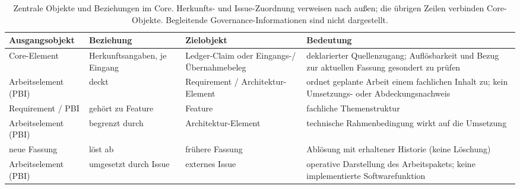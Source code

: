 
\begin{table}[htbp]
  \centering
  \small
  \begin{tabular}{>{\raggedright\arraybackslash}p{}>{\raggedright\arraybackslash}p{}>{\raggedright\arraybackslash}p{}>{\raggedright\arraybackslash}p{}}
    \hline
    \textbf{Ausgangsobjekt} & \textbf{Beziehung} & \textbf{Zielobjekt} & \textbf{Bedeutung} \\
    \hline
    Core-Element & Herkunftsangaben, je Eingang & Ledger-Claim oder Eingangs-/Übernahmebeleg & deklarierter Quellenzugang; Auflösbarkeit und Bezug zur aktuellen Fassung gesondert zu prüfen \\
    Arbeitselement (PBI) & deckt & Requirement / Architektur-Element & ordnet geplante Arbeit einem fachlichen Inhalt zu; kein Umsetzungs- oder Abdeckungsnachweis \\
    Requirement / PBI & gehört zu Feature & Feature & fachliche Themenstruktur \\
    Arbeitselement (PBI) & begrenzt durch & Architektur-Element & technische Rahmenbedingung wirkt auf die Umsetzung \\
    neue Fassung & löst ab & frühere Fassung & Ablösung mit erhaltener Historie (keine Löschung) \\
    Arbeitselement (PBI) & umgesetzt durch Issue & externes Issue & operative Darstellung des Arbeitspakets; keine implementierte Softwarefunktion \\
    \hline
  \end{tabular}
  \caption[Objekte und Beziehungen im Core]{Zentrale Objekte und
    Beziehungen im Core. Herkunfts- und Issue-Zuordnung verweisen
    nach außen; die übrigen Zeilen verbinden Core-Objekte.
    Begleitende Governance-Informationen sind nicht dargestellt.}
  \label{t:core-objektmodell}
\end{table}
